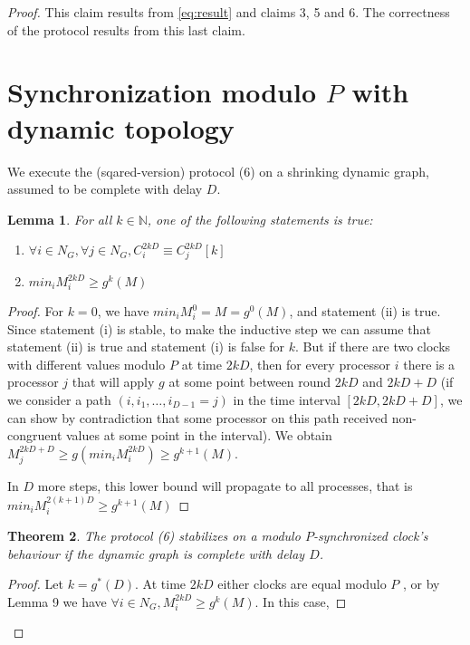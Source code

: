\documentclass[11pt,letterpaper]{article}
\newtheorem{thm}{Theorem}
\newtheorem{lem}[thm]{Lemma}
\begin{document}
\begin{proof}
	This claim results from \eqref{eq:result} and claims 3, 5 and 6.
	The correctness of the protocol results from this last claim.


\section{Synchronization modulo $P$ with dynamic topology}

	We execute the (sqared-version) protocol (6) on a shrinking dynamic graph, assumed to be complete with delay $D$.

\begin{lem}
	For all $k \in \mathds{N}$, one of the following statements is true:
	\begin{enumerate}
		\item $\forall i \in N_G, \forall j \in N_G, C_i^{2kD} \equiv C_j^{2kD} [k]$
		\item $min_i M_i^{2kD} \geq g^k(M)$
	\end{enumerate}
\end{lem}
\begin{proof}
	For $k=0$, we have $min_i M_i^0 = M = g^0(M)$, and
	statement (ii) is true. Since statement (i) is stable, to make
	the inductive step we can assume that statement (ii) is true
	and statement (i) is false for $k$.
	But if there are two clocks
	with different values modulo $P$ at time $2kD$, then for every
	processor $i$ there is a processor $j$ that
	will apply $g$ at some point between round $2kD$ and $2kD+D$
	(if we consider a path $(i, i_1, \dots, i_{D-1} = j)$ in the time interval $[2kD, 2kD+D]$,
	we can show by contradiction that some processor on this path received non-congruent values
	at some point in the interval).
	We obtain
	$M_j^{2kD+D} \geq g(min_i M_i^{2kD}) \geq g^{k+1}(M)$.

	In $D$ more steps, this lower bound will propagate to all processes, that is
	$min_i M_i^{2(k+1)D} \geq g^{k+1}(M)$
\end{proof}

\begin{thm}
	The protocol (6) stabilizes on a modulo $P$-synchronized clock's behaviour if the dynamic graph is complete with delay $D$.
\end{thm}
\begin{proof}
	Let $k = g^*(D)$.
	At time $2kD$ either clocks are equal
	modulo $P$ , or by Lemma 9 we have $\forall i \in N_G, M_i^{2kD} \geq g^k(M)$.
	In this case,


\end{proof}
\end{proof}
\end{document}
